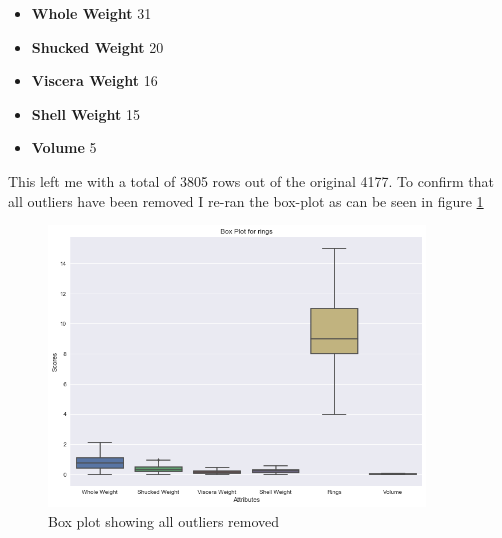 \begin{itemize}
  \item \textbf{Whole Weight} 31
  \item \textbf{Shucked Weight} 20
  \item \textbf{Viscera Weight} 16
  \item \textbf{Shell Weight} 15
  \item \textbf{Volume} 5
\end{itemize}

This left me with a total of 3805 rows out of the original 4177. To confirm that all outliers have been removed I re-ran the box-plot as can be seen in figure \ref{fig:abalone-outlier-done}
\begin{figure}[H]
  \centering
  \includegraphics[scale=0.5,width=100mm]{./images/abalone-outlier-done.png}
  \caption{Box plot showing all outliers removed}
  \label{fig:abalone-outlier-done}
\end{figure}
